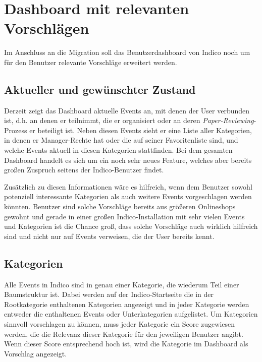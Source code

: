 \chapter{Dashboard mit relevanten Vorschlägen}

Im Anschluss an die Migration soll das Benutzerdashboard von Indico noch um für den Benutzer
relevante Vorschläge erweitert werden.


\section{Aktueller und gewünschter Zustand}

Derzeit zeigt das Dashboard aktuelle Events an, mit denen der User verbunden ist, d.h. an denen er
teilnimmt, die er organisiert oder an deren \emph{Paper-Reviewing}-Prozess er beteiligt ist. Neben
diesen Events sieht er eine Liste aller Kategorien, in denen er Manager-Rechte hat oder die auf
seiner Favoritenliste sind, und welche Events aktuell in diesen Kategorien stattfinden. Bei dem
gesamten Dashboard handelt es sich um ein noch sehr neues Feature, welches aber bereits großen
Zuspruch seitens der Indico-Benutzer findet.

Zusätzlich zu diesen Informationen wäre es hilfreich, wenn dem Benutzer sowohl potenziell
interessante Kategorien als auch weitere Events vorgeschlagen werden könnten. Benutzer sind solche
Vorschläge bereits aus größeren Onlineshops gewohnt und gerade in einer großen Indico-Installation
mit sehr vielen Events und Kategorien ist die Chance groß, dass solche Vorschläge auch wirklich
hilfreich sind und nicht nur auf Events verweisen, die der User bereits kennt.


\section{Kategorien}\label{categorysuggest}

Alle Events in Indico sind in genau einer Kategorie, die wiederum Teil einer Baumstruktur ist. Dabei
werden auf der Indico-Startseite die in der Rootkategorie enthaltenen Kategorien angezeigt und in
jeder Kategorie werden entweder die enthaltenen Events oder Unterkategorien aufgelistet. Um
Kategorien sinnvoll vorschlagen zu können, muss jeder Kategorie ein Score zugewiesen werden, die die
Relevanz dieser Kategorie für den jeweiligen Benutzer angibt. Wenn dieser Score entsprechend hoch
ist, wird die Kategorie im Dashboard als Vorschlag angezeigt.

